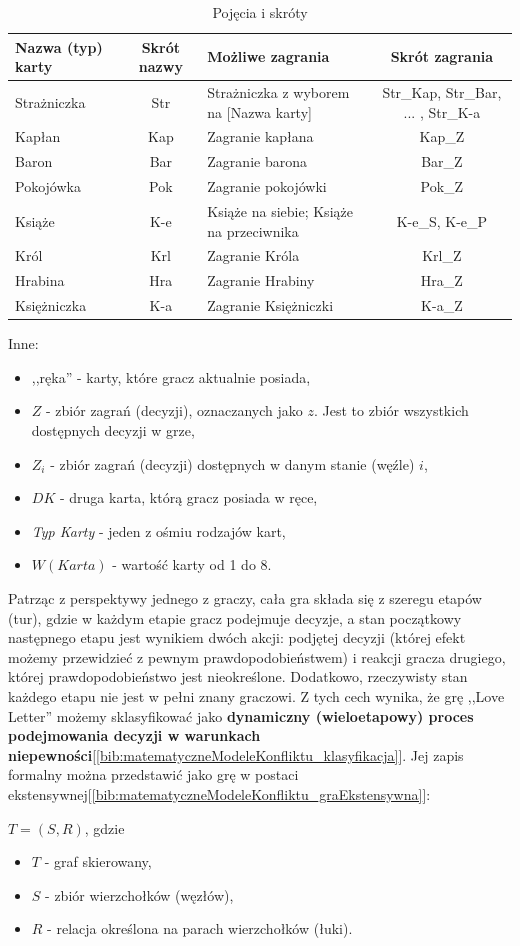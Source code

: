 \begin{table}[H]
	\caption{Pojęcia i skróty}
	\centering
	\begin{tabular}{|l|c|p{4cm}|c|}
		\hline
		\bf{Nazwa (typ) karty} & \bf{Skrót nazwy}  & \bf{Możliwe zagrania} & \bf{Skrót zagrania} \\ \hline
		Strażniczka & Str & Strażniczka z wyborem na [Nazwa karty] & Str\_Kap, Str\_Bar, ... , Str\_K-a  \\ \hline
		Kapłan & Kap & Zagranie kapłana & Kap\_Z \\ \hline
		Baron & Bar & Zagranie barona & Bar\_Z  \\ \hline
		Pokojówka & Pok & Zagranie pokojówki & Pok\_Z \\ \hline
		Książe & K-e & Książe na siebie; Książe na przeciwnika & K-e\_S, K-e\_P  \\ \hline
		Król & Krl & Zagranie Króla & Krl\_Z \\ \hline
		Hrabina & Hra & Zagranie Hrabiny & Hra\_Z \\ \hline
		Księżniczka & K-a & Zagranie Księżniczki & K-a\_Z \\ \hline
	\end{tabular}
\end{table}
Inne:
\begin{itemize}
	\item ,,ręka'' - karty, które gracz aktualnie posiada,
	\item $Z$ - zbiór zagrań (decyzji), oznaczanych jako $z$. Jest to zbiór wszystkich dostępnych decyzji w grze,
	\item $Z_i$ - zbiór zagrań (decyzji) dostępnych w danym stanie (węźle) $i$,
	\item $DK$ - druga karta, którą gracz posiada w ręce,
	\item \textit{Typ Karty} - jeden z ośmiu rodzajów kart,
	\item $W(Karta)$ - wartość karty od 1 do 8.
\end{itemize}

Patrząc z perspektywy jednego z graczy, cała gra składa się z szeregu etapów  (tur), gdzie w każdym etapie gracz podejmuje decyzje, a stan początkowy następnego etapu jest wynikiem dwóch akcji: podjętej decyzji (której efekt możemy przewidzieć z pewnym prawdopodobieństwem) i reakcji gracza drugiego, której prawdopodobieństwo jest nieokreślone. Dodatkowo, rzeczywisty stan każdego etapu nie jest w pełni znany graczowi. Z tych cech wynika, że grę ,,Love Letter'' możemy sklasyfikować jako \textbf{dynamiczny (wieloetapowy) proces podejmowania decyzji w warunkach niepewności}[\ref{bib:matematyczneModeleKonfliktu_klasyfikacja}]. Jej zapis formalny można przedstawić jako grę w postaci ekstensywnej[\ref{bib:matematyczneModeleKonfliktu_graEkstensywna}]:
\begin{center}
	$T = (S,R)$, gdzie
	\begin{itemize}
		\item $T$ - graf skierowany,
		\item $S$ - zbiór wierzchołków (węzłów),
		\item $R$ - relacja określona na parach wierzchołków (łuki).
	\end{itemize}
\end{center}

